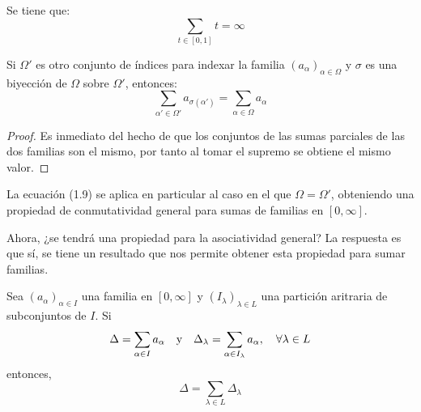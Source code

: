 \documentclass[12pt]{report}
\newcounter{it}
\theoremstyle{largebreak}
\begin{document}
    \begin{exa}
        Se tiene que:
        \begin{equation*}
            \sum_{t\in[0,1]}t=\infty
        \end{equation*}
    \end{exa}

    \begin{propo}
        Si $\Omega'$ es otro conjunto de índices para indexar la familia $\left(a_\alpha\right)_{\alpha\in\Omega}$ y $\sigma$ es una biyección de $\Omega$ sobre $\Omega'$, entonces:
        \begin{equation}
            \sum_{\alpha'\in\Omega'}a_{\sigma(\alpha')}=\sum_{\alpha\in\Omega}a_\alpha
        \end{equation}
    \end{propo}

    \begin{proof}
        Es inmediato del hecho de que los conjuntos de las sumas parciales de las dos familias son el mismo, por tanto al tomar el supremo se obtiene el mismo valor.
    \end{proof}

    La ecuación (1.9) se aplica en particular al caso en el que $\Omega=\Omega'$, obteniendo una propiedad de conmutatividad general para sumas de familias en $[0,\infty]$.

    Ahora, ¿se tendrá una propiedad para la asociatividad general? La respuesta es que sí, se tiene un resultado que nos permite obtener esta propiedad para sumar familias.

    \begin{theor}
        Sea $\left(a_\alpha\right)_{\alpha\in I}$ una familia en $[0,\infty]$ y $\left(I_\lambda\right)_{\lambda\in L}$ una partición aritraria de subconjuntos de $I$. Si
        \begin{equation*}
            \Delta=\sum_{\alpha\in I}a_\alpha\quad\textup{y}\quad\Delta_\lambda=\sum_{\alpha\in I_\lambda}a_\alpha,\quad\forall\lambda\in L
        \end{equation*}
        entonces,
        \begin{equation*}
            \Delta=\sum_{\lambda\in L}\Delta_\lambda
        \end{equation*}
    \end{theor}
\end{document}
